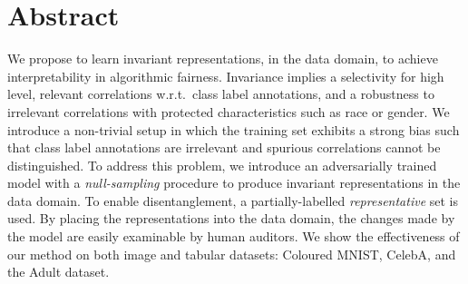 \section{Abstract}
\noindent
We propose to learn invariant representations, in the data domain, to achieve interpretability in
algorithmic fairness. Invariance implies a selectivity for high level, relevant correlations
w.r.t.\ class label annotations, and a robustness to irrelevant correlations with protected
characteristics such as race or gender. We introduce a non-trivial setup in which the training set
exhibits a strong bias such that class label annotations are irrelevant and spurious correlations
cannot be distinguished. To address this problem, we introduce an adversarially trained model with
a \emph{null-sampling} procedure to produce invariant representations in the data domain. To enable
disentanglement, a partially-labelled \emph{representative} set is used. By placing the
representations into the data domain, the changes made by the model are easily examinable by human
auditors. We show the effectiveness of our method on both image and tabular datasets: Coloured
MNIST, CelebA, and the Adult dataset.
